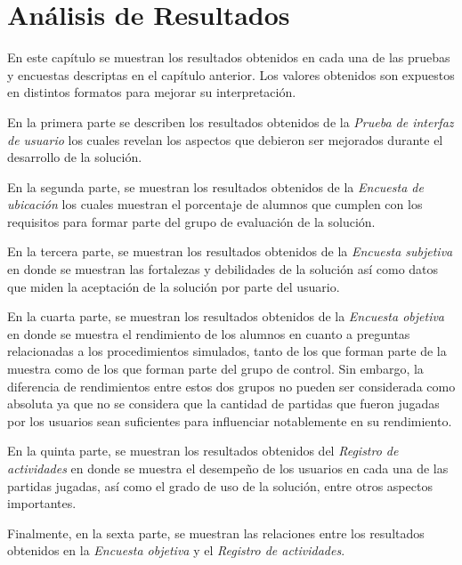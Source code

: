 \chapter{Análisis de Resultados}
\label{chap:analisis}

En este capítulo se muestran los resultados obtenidos en cada una de las pruebas 
y encuestas descriptas en el capítulo anterior. Los valores obtenidos son expuestos en
distintos formatos para mejorar su interpretación.

En la primera parte se describen los resultados obtenidos de la \emph{Prueba de interfaz de usuario} 
los cuales revelan los aspectos que debieron ser mejorados durante el desarrollo de 
la solución. 

En la segunda parte, se muestran los resultados obtenidos de la 
\emph{Encuesta de ubicación} los cuales muestran el porcentaje de alumnos que cumplen 
con los requisitos para formar parte del grupo de evaluación de la solución.

En la tercera parte, se muestran los resultados obtenidos de la \emph{Encuesta subjetiva} 
en donde se muestran las fortalezas y debilidades de la solución así como datos que miden 
la aceptación de la solución por parte del usuario. 

En la cuarta parte, se muestran los resultados obtenidos de la \emph{Encuesta objetiva} 
en donde se muestra el rendimiento de los alumnos en cuanto a preguntas relacionadas a 
los procedimientos simulados, tanto de los que forman parte de la muestra como de los que 
forman parte del grupo de control. Sin embargo, la diferencia de rendimientos entre 
estos dos grupos no pueden ser considerada como absoluta ya que no se considera que 
la cantidad de partidas que fueron jugadas por los usuarios sean suficientes para 
influenciar notablemente en su rendimiento.

En la quinta parte, se muestran los resultados obtenidos del \emph{Registro de actividades} 
en donde se muestra el desempeño de los usuarios en cada una de las partidas jugadas, así como 
el grado de uso de la solución, entre otros aspectos importantes.

Finalmente, en la sexta parte, se muestran las relaciones entre los resultados obtenidos en 
la \emph{Encuesta objetiva} y el \emph{Registro de actividades}.








%



